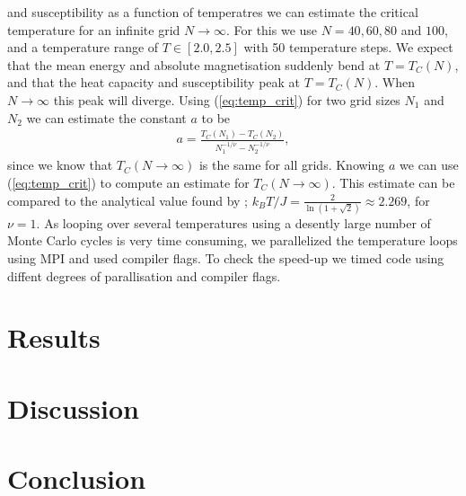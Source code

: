 \documentclass[twocolumn]{aastex62}
\begin{document}
and susceptibility as a function of temperatres we can estimate the critical
temperature for an infinite grid $N\to \infty$. For this we use $N = 40, 60, 80$
and $100$, and a temperature range of $T\in[2.0, 2.5]$ with 50 temperature steps. We expect that the mean energy
and absolute magnetisation suddenly bend at $T = T_C(N)$, and that the heat
capacity and susceptibility peak at $T = T_C(N)$. When $N\to\infty$ this peak
will diverge. Using (\ref{eq:temp_crit}) for two grid sizes $N_1$ and $N_2$ we
can estimate the constant $a$ to be 
\begin{align}
	a = \frac{T_C(N_1) - T_C(N_2)}{N_1^{-1/\nu} - N_2^{-1/\nu}},
\end{align}
since we know that $T_C(N\to\infty)$ is the same for all grids. Knowing $a$ we
can use (\ref{eq:temp_crit}) to compute an estimate for $T_C(N\to\infty)$. This
estimate can be compared to the analytical value found by \cite{onsager:1944};
$k_BT/J = \frac{2}{\ln(1+\sqrt{2})}\approx 2.269$, for $\nu = 1$.
As looping over several temperatures using a desently large number of Monte
Carlo cycles is very time consuming, we parallelized the temperature loops using
MPI and used compiler flags. To check the speed-up we timed code using diffent
degrees of parallisation and compiler flags.

\section{Results} \label{sec:results}

\begin{figure*}
	\texttt{[image: \{Figures/thermo\_quants]}.pdf}
	\caption{}
	\label{fig:thermo_quants}
\end{figure*}

\section{Discussion} \label{sec:discussion}

\section{Conclusion} \label{sec:conclusion}




\end{document}
